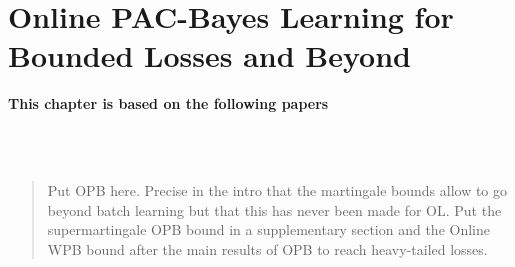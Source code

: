 \chapter[Online PAC-Bayes Learning for Bounded Losses and Beyond]{Online PAC-Bayes Learning for Bounded Losses and Beyond}
\label{chap:online-pb}

\addchapterlof
\addchapterloa
\addchapterloe

\vspace{-1.0cm}
\begin{center}
\textbf{This chapter is based on the following papers}\\[0.1cm]
\end{center}
\\
\\

\vspace{0.2cm}
\minitoc

\begin{abstract}
Put OPB here. Precise in the intro that the martingale bounds allow to go beyond batch learning but that this has never been made for OL. Put the supermartingale OPB bound in a supplementary section and the Online WPB bound after the main results of OPB to reach heavy-tailed losses. 
\end{abstract}

\newpage


